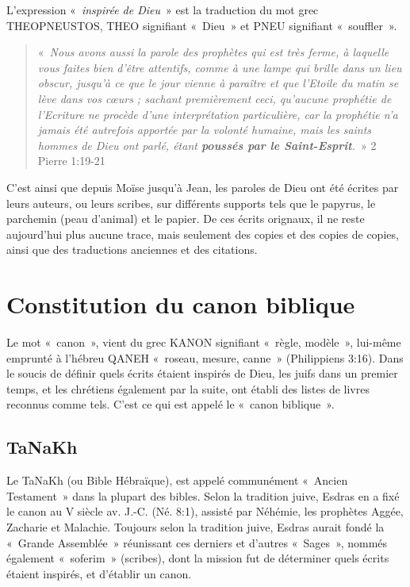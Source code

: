 \begin{small}
L'expression «~\emph{inspirée de Dieu}~» est la traduction du mot grec THEOPNEUSTOS, THEO signifiant «~Dieu~» et PNEU signifiant «~souffler~».

\begin{quote}
«~\emph{Nous avons aussi la parole des prophètes qui est très ferme, à laquelle vous faites bien d'être attentifs, comme à une lampe qui brille dans un lieu obscur, jusqu'à ce que le jour vienne à paraître et que l'Etoile du matin se lève dans vos cœurs ; sachant premièrement ceci, qu'aucune prophétie de l'Ecriture ne procède d'une interprétation particulière, car la prophétie n'a jamais été autrefois apportée par la volonté humaine, mais les saints hommes de Dieu ont parlé, étant \textbf{poussés par le Saint-Esprit}.}~» 2 Pierre 1:19-21
\end{quote}

C'est ainsi que depuis Moïse jusqu'à Jean, les paroles de Dieu ont été écrites par leurs auteurs, ou leurs scribes, sur différents supports tels que le papyrus, le parchemin (peau d'animal) et le papier. De ces écrits orignaux, il ne reste aujourd'hui plus aucune trace, mais seulement des copies et des copies de copies, ainsi que des traductions anciennes et des citations.

\section*{Constitution du canon biblique}

Le mot «~canon~», vient du grec KANON signifiant «~règle, modèle~», lui-même emprunté à l'hébreu QANEH «~roseau, mesure, canne~» (Philippiens 3:16). Dans le soucis de définir quels écrits étaient inspirés de Dieu, les juifs dans un premier temps, et les chrétiens également par la suite, ont établi des listes de livres reconnus comme tels. C'est ce qui est appelé le «~canon biblique~».

\subsection*{TaNaKh}

Le TaNaKh (ou Bible Hébraïque), est appelé communément «~Ancien Testament~» dans la plupart des bibles. Selon la tradition juive, Esdras en a fixé le canon au V siècle av. J.-C. (Né. 8:1), assisté par Néhémie, les prophètes Aggée, Zacharie et Malachie. Toujours selon la tradition juive, Esdras aurait fondé la «~Grande Assemblée~» réunissant ces derniers et d'autres «~Sages~», nommés également «~soferim~» (scribes), dont la mission fut de déterminer quels écrits étaient inspirés, et d'établir un canon.\bigskip


\end{small}
